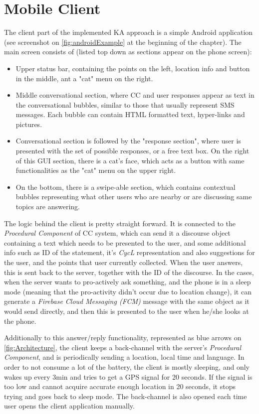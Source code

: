 \section{Mobile Client}
\label{section:app}
The client part of the implemented KA approach is a simple Android application
(see screenshot on \autoref{fig:androidExample} at the beginning of the chapter).
The main screen consists of (listed top down as sections appear on the phone 
screen):
\begin{itemize}
\item Upper status bar, containing the points on the left, location info and 
button in the middle, ant a "cat" menu on the right.
\item Middle conversational section, where CC and user responses appear as
text in the conversational bubbles, similar to those that usually represent 
SMS messages. Each bubble can contain HTML formatted text, hyper-links and 
pictures.
\item Conversational section is followed by the "response section", where user
is presented with the set of possible responses, or a free text box. On the 
right of this GUI section, there is a cat's face, which acts as a button with
same functionalities as the "cat" menu on the upper right.
\item On the bottom, there is a swipe-able section, which contains contextual
bubbles representing what other users  who are nearby or are discussing same 
topics are answering.
\end{itemize} 

The logic behind the client is pretty straight forward. It is connected to the
\emph{Procedural Component} of CC system, which can send it a discourse object
containing a text which needs to be presented to the user, and some additional 
info such as ID of the statement, it's \emph{CycL} representation and also
suggestions for the user, and the points that user currently collected. When 
the user answers, this is sent back to the server, together with the ID of the 
discourse. In the cases, when the server wants to pro-actively ask something,
and the phone is in a sleep mode (meaning that the pro-activity didn't occur due
to location change), it can generate a \emph{Firebase Cloud Messaging (FCM)}
message with the same object as
it would send directly, and then this is presented to the user when he/she 
looks at the phone.

Additionally to this answer/reply functionality, represented as blue arrows on
\autoref{fig:Architecture}, the client keeps a back-channel with the 
server's \emph{Procedural Component}, and is periodically sending a location,
local time and language. In order to not consume a lot of the battery, the 
client is mostly sleeping, and only wakes up every 3min and tries to get a GPS
signal for 20 seconds. If the signal is too low and cannot acquire accurate 
enough location in 20 seconds, it stops trying and goes back to sleep mode.
The back-channel is also opened each time user opens the client application
manually.

